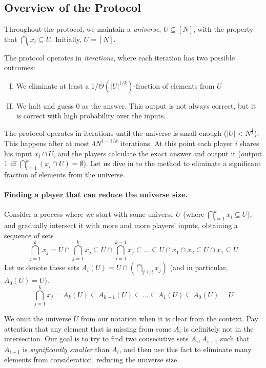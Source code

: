 \documentclass{article}
\theoremstyle{plain}
\begin{document}
\subsection{Overview of the Protocol}
Throughout the protocol, we maintain a \emph{universe}, $U \subseteq [N]$,
with the property that $\bigcap_i x_i \subseteq U$.
Initially, $U = [N]$.

The protocol operates in \emph{iterations}, where each iteration has two possible outcomes:
\begin{enumerate}[I.]
  \item We eliminate at least a $1/\Theta(|U|^{1/k})$-fraction of elements from $U$
  \item We halt and guess 0 as the answer. This output is not always correct, but it is correct with high probability over the inputs.
\end{enumerate}
The protocol operates in iterations until the universe is small enough ($|U| < N^{\frac{1}{k}}$). This happens after at most $4N^{1 - 1/k}$ iterations. At this point each player $i$ shares his input $x_i \cap U$,
and the players calculate the exact answer and output it (output 1 iff $\bigcap_{i = 1}^k (x_i \cap U) = \emptyset$). \newline
\newline
Let us dive in to the method to eliminate a significant fraction of elements from the universe.

\paragraph{Finding a player that can reduce the universe size.}
Consider a process where we start with some universe $U$ (where $\bigcap_{i = 1}^k x_i \subseteq U$),
and gradually intersect it with more and more players' inputs, 
obtaining a sequence of sets
\begin{equation*}
    \bigcap_{j = 1}^k x_j = U \cap \bigcap_{j = 1}^k x_j \subseteq  U \cap \bigcap_{j = 1}^{k-1} x_j \subseteq \ldots \subseteq  U \cap x_1 \cap x_2 \subseteq  U \cap x_1 \subseteq U
\end{equation*}
Let us denote these sets $A_i(U) = U \cap (\bigcap_{j \leq i} x_j)$ (and in particular, $A_0(U) = U$).
\begin{equation*}
    \bigcap_{j = 1}^k x_j = A_k(U) \subseteq A_{k-1}(U) \subseteq \ldots \subseteq A_1(U) \subseteq A_0(U) = U
\end{equation*}

We omit the universe $U$ from our notation when it is clear from the context. \newline
Pay attention that any element that is missing from some $A_i$ is definitely not in the intersection.
Our goal is to try to find two consecutive sets $A_i, A_{i+1}$ such that $A_{i+1}$ is \emph{significantly smaller} than $A_i$,
and then use this fact to eliminate many elements from consideration, reducing the universe size.
\end{document}

